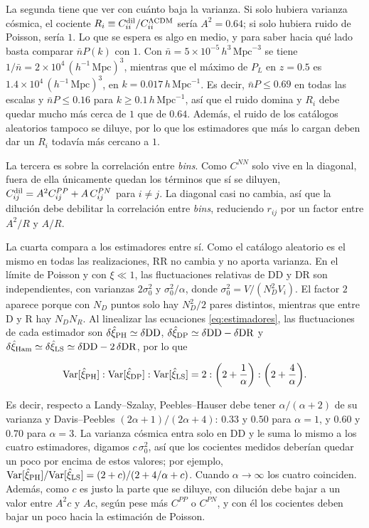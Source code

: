 \documentclass[letterpaper, 12pt]{article}
\newcommand{\hMpc}{\ensuremath{h^{-1}\,\mathrm{Mpc}}}
\newcommand{\DD}{\mathrm{DD}}
\newcommand{\DR}{\mathrm{DR}}
\newcommand{\RR}{\mathrm{RR}}
\newcommand{\LCDM}{\Lambda\mathrm{CDM}}
\begin{document}
            La segunda tiene que ver con cuánto baja la varianza. Si solo hubiera varianza cósmica, el cociente $R_i \equiv C_{ii}^{\rm dil}/C_{ii}^{\LCDM}$ sería $A^2 = 0.64$; si solo hubiera ruido de Poisson, sería $1$. Lo que se espera es algo en medio, y para saber hacia qué lado basta comparar $\bar nP(k)$ con $1$. Con $\bar n = 5\times10^{-5}\,h^3\,\mathrm{Mpc}^{-3}$ se tiene $1/\bar n = 2\times10^4\,(\hMpc)^3$, mientras que el máximo de $P_L$ en $z = 0.5$ es $1.4\times10^4\,(\hMpc)^3$, en $k = 0.017\,h\,\mathrm{Mpc}^{-1}$. Es decir, $\bar nP \leq 0.69$ en todas las escalas y $\bar nP \leq 0.16$ para $k \geq 0.1\,h\,\mathrm{Mpc}^{-1}$, así que el ruido domina y $R_i$ debe quedar mucho más cerca de $1$ que de $0.64$. Además, el ruido de los catálogos aleatorios tampoco se diluye, por lo que los estimadores que más lo cargan deben dar un $R_i$ todavía más cercano a $1$.

            La tercera es sobre la correlación entre \emph{bins}. Como $C^{NN}$ solo vive en la diagonal, fuera de ella únicamente quedan los términos que sí se diluyen, $C_{ij}^{\rm dil} = A^2C_{ij}^{PP} + A\,C_{ij}^{PN}$ para $i \neq j$. La diagonal casi no cambia, así que la dilución debe debilitar la correlación entre \emph{bins}, reduciendo $r_{ij}$ por un factor entre $A^2/R$ y $A/R$.

            La cuarta compara a los estimadores entre sí. Como el catálogo aleatorio es el mismo en todas las realizaciones, $\RR$ no cambia y no aporta varianza. En el límite de Poisson y con $\xi \ll 1$, las fluctuaciones relativas de $\DD$ y $\DR$ son independientes, con varianzas $2\sigma_0^2$ y $\sigma_0^2/\alpha$, donde $\sigma_0^2 = V/(N_D^2V_i)$. El factor $2$ aparece porque con $N_D$ puntos solo hay $N_D^2/2$ pares distintos, mientras que entre D y R hay $N_DN_R$. Al linealizar las ecuaciones \eqref{eq:estimadores}, las fluctuaciones de cada estimador son $\delta\hat\xi_{\rm PH} \simeq \delta\DD$, $\delta\hat\xi_{\rm DP} \simeq \delta\DD - \delta\DR$ y $\delta\hat\xi_{\rm Ham} \simeq \delta\hat\xi_{\rm LS} \simeq \delta\DD - 2\,\delta\DR$, por lo que

            \begin{equation}\label{eq:var_poisson}
                {\rm Var}[\hat\xi_{\rm PH}] : {\rm Var}[\hat\xi_{\rm DP}] : {\rm Var}[\hat\xi_{\rm LS}] = 2 : \qty(2 + \frac{1}{\alpha}) : \qty(2 + \frac{4}{\alpha}).
            \end{equation}

            Es decir, respecto a Landy--Szalay, Peebles--Hauser debe tener $\alpha/(\alpha+2)$ de su varianza y Davis--Peebles $(2\alpha+1)/(2\alpha+4)$: $0.33$ y $0.50$ para $\alpha = 1$, y $0.60$ y $0.70$ para $\alpha = 3$. La varianza cósmica entra solo en $\DD$ y le suma lo mismo a los cuatro estimadores, digamos $c\,\sigma_0^2$, así que los cocientes medidos deberían quedar un poco por encima de estos valores; por ejemplo, ${\rm Var}[\hat\xi_{\rm PH}]/{\rm Var}[\hat\xi_{\rm LS}] = (2 + c)/(2 + 4/\alpha + c)$. Cuando $\alpha \to \infty$ los cuatro coinciden. Además, como $c$ es justo la parte que se diluye, con dilución debe bajar a un valor entre $A^2c$ y $Ac$, según pese más $C^{PP}$ o $C^{PN}$, y con él los cocientes deben bajar un poco hacia la estimación de Poisson.
\end{document}
